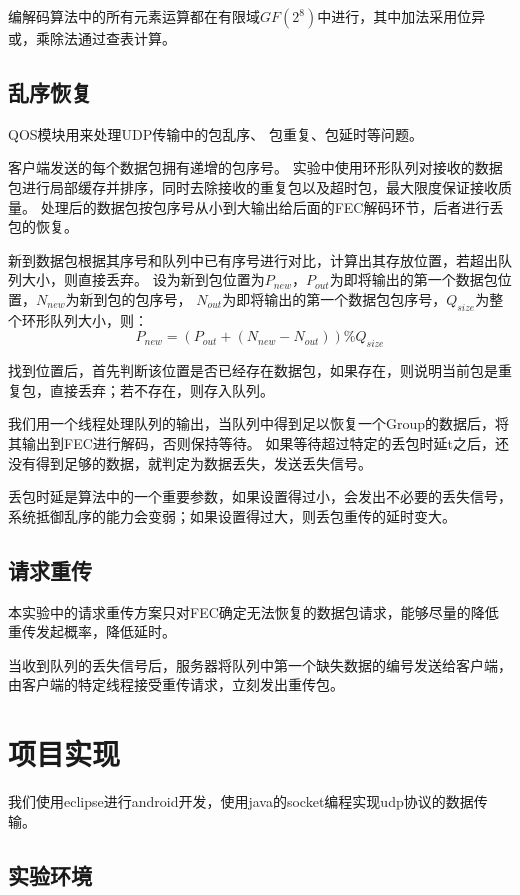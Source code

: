 \documentclass[onecolumn]{article}
\begin{document}
\begin{CJK*}{UTF8}{gbsn}
		编解码算法中的所有元素运算都在有限域$GF(2^8)$中进行，其中加法采用位异或，乘除法通过查表计算。
		
		\subsection{乱序恢复}
		QOS模块用来处理UDP传输中的包乱序、 包重复、包延时等问题。
		
		客户端发送的每个数据包拥有递增的包序号。
		实验中使用环形队列对接收的数据包进行局部缓存并排序，同时去除接收的重复包以及超时包，最大限度保证接收质量。
		处理后的数据包按包序号从小到大输出给后面的FEC解码环节，后者进行丢包的恢复。
		
		新到数据包根据其序号和队列中已有序号进行对比，计算出其存放位置，若超出队列大小，则直接丢弃。
		设为新到包位置为$P_{new}$，$P_{out}$为即将输出的第一个数据包位置，$N_{new} $为新到包的包序号， $N_{out} $为即将输出的第一个数据包包序号，$Q_{size}$为整个环形队列大小，则：
		$$P_{new} = (P_{out} + (N_{new} - N_{out}))\%Q_{size}$$
		
		找到位置后，首先判断该位置是否已经存在数据包，如果存在，则说明当前包是重复包，直接丢弃；若不存在，则存入队列。
		
		我们用一个线程处理队列的输出，当队列中得到足以恢复一个Group的数据后，将其输出到FEC进行解码，否则保持等待。
		如果等待超过特定的丢包时延t之后，还没有得到足够的数据，就判定为数据丢失，发送丢失信号。
		
		丢包时延是算法中的一个重要参数，如果设置得过小，会发出不必要的丢失信号，系统抵御乱序的能力会变弱；如果设置得过大，则丢包重传的延时变大。
		
		\subsection{请求重传}
		本实验中的请求重传方案只对FEC确定无法恢复的数据包请求，能够尽量的降低重传发起概率，降低延时。
		
		当收到队列的丢失信号后，服务器将队列中第一个缺失数据的编号发送给客户端，由客户端的特定线程接受重传请求，立刻发出重传包。
		
\section{项目实现}
		我们使用eclipse进行android开发，使用java的socket编程实现udp协议的数据传输。
		
		\subsection{实验环境}

\end{CJK*}
\end{document}
